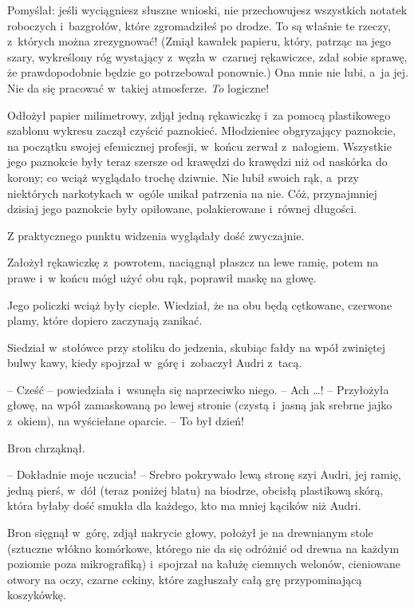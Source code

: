 \documentclass[oneside,polish,11pt,rmheadings]{mwbk}
\begin{document}
Pomyślał: jeśli wyciągniesz słuszne wnioski, nie przechowujesz wszystkich notatek roboczych i~bazgrołów, które zgromadziłeś po drodze. To są właśnie te rzeczy, z~których można zrezygnować! (Zmiął kawałek papieru, który, patrząc na jego szary, wykreślony róg wystający z~węzła w~czarnej rękawiczce, zdał sobie sprawę, że prawdopodobnie będzie go potrzebował ponownie.) Ona mnie nie lubi, a~ja jej. Nie da się pracować w~takiej atmosferze. \textit{To }logiczne! 

Odłożył papier milimetrowy, zdjął jedną rękawiczkę i~za pomocą plastikowego szablonu wykresu zaczął czyścić paznokieć. Młodzieniec obgryzający paznokcie, na początku swojej efemicznej profesji, w~końcu zerwał z~nałogiem. Wszystkie jego paznokcie były teraz szersze od krawędzi do krawędzi niż od naskórka do korony; co wciąż wyglądało trochę dziwnie. Nie lubił swoich rąk, a~przy niektórych narkotykach w~ogóle unikał patrzenia na nie. Cóż, przynajmniej dzisiaj jego paznokcie były opiłowane, polakierowane i~równej długości. 

Z praktycznego punktu widzenia wyglądały dość zwyczajnie. 

Założył rękawiczkę z~powrotem, naciągnął płaszcz na lewe ramię, potem na prawe i~w końcu mógł użyć obu rąk, poprawił maskę na głowę. 

Jego policzki wciąż były ciepłe. Wiedział, że na obu będą cętkowane, czerwone plamy, które dopiero zaczynają zanikać. 

Siedział w~stołówce przy stoliku do jedzenia, skubiąc fałdy na wpół zwiniętej bulwy kawy, kiedy spojrzał w~górę i~zobaczył Audri z~tacą.  

-- Cześć -- powiedziała i~wsunęła się naprzeciwko niego.  -- Ach  \ldots ! -- Przyłożyła głowę, na wpół zamaskowaną po lewej stronie (czystą i~jasną jak srebrne jajko z~okiem), na wyściełane oparcie. -- To był dzień! 

Bron chrząknął. 

-- Dokładnie moje uczucia! -- Srebro pokrywało lewą stronę szyi Audri, jej ramię, jedną pierś, w~dół (teraz poniżej blatu) na biodrze, obcisłą plastikową skórą, która byłaby dość smukła dla każdego, kto ma mniej kącików niż Audri. 

Bron sięgnął w~górę, zdjął nakrycie głowy, położył je na drewnianym stole (sztuczne włókno komórkowe, którego nie da się odróżnić od drewna na każdym poziomie poza mikrografiką) i~spojrzał na kałużę ciemnych welonów, cieniowane otwory na oczy, czarne cekiny, które zagłuszały całą grę przypominającą koszykówkę.  
\end{document}

